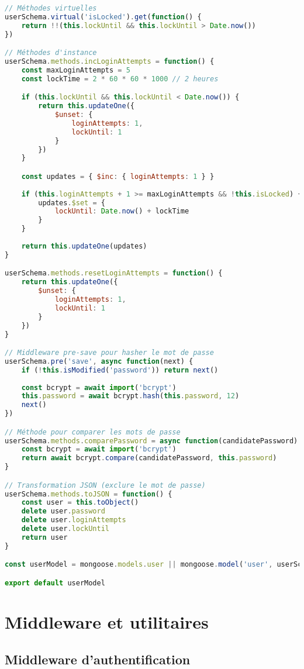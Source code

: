 \begin{lstlisting}[language=JavaScript, caption=userModel.js - Schéma MongoDB pour les utilisateurs]
// Méthodes virtuelles
userSchema.virtual('isLocked').get(function() {
    return !!(this.lockUntil && this.lockUntil > Date.now())
})

// Méthodes d'instance
userSchema.methods.incLoginAttempts = function() {
    const maxLoginAttempts = 5
    const lockTime = 2 * 60 * 60 * 1000 // 2 heures

    if (this.lockUntil && this.lockUntil < Date.now()) {
        return this.updateOne({
            $unset: {
                loginAttempts: 1,
                lockUntil: 1
            }
        })
    }

    const updates = { $inc: { loginAttempts: 1 } }
    
    if (this.loginAttempts + 1 >= maxLoginAttempts && !this.isLocked) {
        updates.$set = {
            lockUntil: Date.now() + lockTime
        }
    }
    
    return this.updateOne(updates)
}

userSchema.methods.resetLoginAttempts = function() {
    return this.updateOne({
        $unset: {
            loginAttempts: 1,
            lockUntil: 1
        }
    })
}

// Middleware pre-save pour hasher le mot de passe
userSchema.pre('save', async function(next) {
    if (!this.isModified('password')) return next()
    
    const bcrypt = await import('bcrypt')
    this.password = await bcrypt.hash(this.password, 12)
    next()
})

// Méthode pour comparer les mots de passe
userSchema.methods.comparePassword = async function(candidatePassword) {
    const bcrypt = await import('bcrypt')
    return await bcrypt.compare(candidatePassword, this.password)
}

// Transformation JSON (exclure le mot de passe)
userSchema.methods.toJSON = function() {
    const user = this.toObject()
    delete user.password
    delete user.loginAttempts
    delete user.lockUntil
    return user
}

const userModel = mongoose.models.user || mongoose.model('user', userSchema)

export default userModel
\end{lstlisting}

\section{Middleware et utilitaires}

\subsection{Middleware d'authentification}

